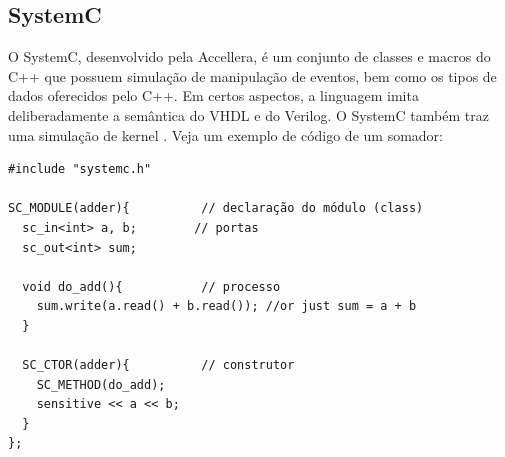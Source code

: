 \documentclass[12pt,a4paper]{article}
\begin{document}
\subsection{SystemC}
O SystemC, desenvolvido pela Accellera, é um conjunto de classes e macros do C++ que possuem  simulação de manipulação de eventos, bem como os tipos de dados oferecidos pelo C++. Em certos aspectos, a linguagem imita deliberadamente  a semântica do VHDL e do Verilog. O SystemC também traz uma simulação de kernel \cite{PS2}. Veja um exemplo de código de um somador:

\begin{verbatim}
#include "systemc.h"

SC_MODULE(adder){          // declaração do módulo (class)
  sc_in<int> a, b;        // portas
  sc_out<int> sum;

  void do_add(){           // processo
    sum.write(a.read() + b.read()); //or just sum = a + b
  }

  SC_CTOR(adder){          // construtor
    SC_METHOD(do_add);    
    sensitive << a << b;
  }
};
\end{verbatim}
\end{document}
